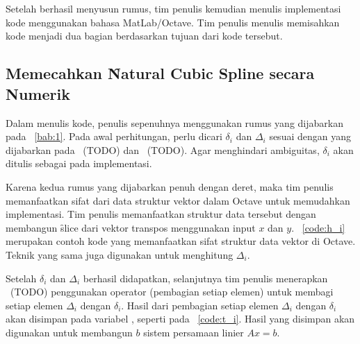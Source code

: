 \chapter{\babDua}
\label{bab:2}
Setelah berhasil menyusun rumus, tim penulis kemudian menulis implementasi kode menggunakan
bahasa MatLab/Octave. Tim penulis menulis memisahkan kode menjadi dua bagian berdasarkan
tujuan dari kode tersebut.


\section{Memecahkan \f{Natural Cubic Spline} secara Numerik}
\label{sec:numericCubicSpline}
Dalam menulis kode, penulis sepenuhnya menggunakan rumus yang dijabarkan pada
\bab~\ref{bab:1}. Pada awal perhitungan, perlu dicari $\delta_i$ dan $\Delta_i$
sesuai dengan yang dijabarkan pada \equ~(TODO) dan \equ~(TODO). Agar menghindari
ambiguitas, $\delta_i$ akan ditulis sebagai  pada implementasi.

Karena kedua rumus yang dijabarkan penuh dengan deret, maka tim penulis
memanfaatkan sifat dari data struktur vektor dalam Octave untuk memudahkan
implementasi. Tim penulis memanfaatkan struktur data tersebut dengan membangun
\f{slice} dari vektor transpos menggunakan input $x$ dan $y$. \lst~\ref{code:h_i}
merupakan contoh kode yang memanfaatkan sifat struktur data vektor di Octave.
Teknik yang sama juga digunakan untuk menghitung $\Delta_i$.



Setelah $\delta_i$ dan $\Delta_i$ berhasil didapatkan, selanjutnya tim penulis
menerapkan \equ~(TODO) penggunakan operator  (pembagian setiap elemen)
untuk membagi setiap elemen $\Delta_i$ dengan $\delta_i$. Hasil dari pembagian
setiap elemen $\Delta_i$ dengan $\delta_i$ akan disimpan pada variabel ,
seperti pada \lst~\ref{code:t_i}. Hasil yang disimpan akan digunakan untuk
membangun $b$ sistem persamaan linier $A x = b$.



